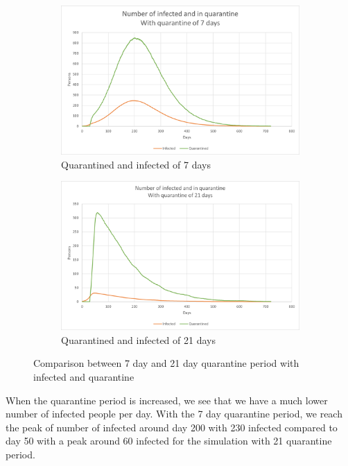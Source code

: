 \begin{figure}[H]
\centering
\begin{subfigure}{.5\textwidth}
  \centering
  \includegraphics[width=.95\linewidth]{0_billeder/CT_Q_7.png}
  \caption{Quarantined and infected of 7 days}
  \label{fig:CT_Q_7}
\end{subfigure}%
\begin{subfigure}{.5\textwidth}
  \centering
  \includegraphics[width=.95\linewidth]{0_billeder/CT_Q_21.png}
  \caption{Quarantined and infected of 21 days}
  \label{fig:CT_Q_21}
\end{subfigure}
\caption{Comparison between 7 day and 21 day quarantine period with infected and quarantine}
\label{fig:CT_Q}
\end{figure}

When the quarantine period is increased, we see that we have a much lower number of infected people per day. With the 7 day quarantine period, we reach the peak of number of infected around day 200 with 230 infected compared to day 50 with a peak around 60 infected for the simulation with 21 quarantine period.

